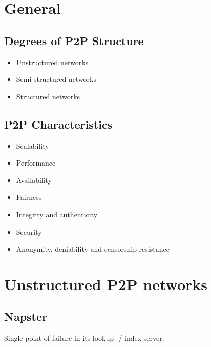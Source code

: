 

	\frontmatter
	\maketitle
	
	\tableofcontents*
	
	\mainmatter
	
	\chapter{General}
	
	\section{Degrees of P2P Structure}
	\begin{itemize}
		\item Unstructured networks
		\item Semi-structured networks
		\item Structured networks	
	\end{itemize}
	
	
	\section{P2P Characteristics}
	\begin{itemize}
		\item Scalability
		\item Performance
		\item Availability
		\item Fairness
		\item Integrity and authenticity
		\item Security
		\item Anonymity, deniability and censorship resistance
	\end{itemize}
	
	\chapter{Unstructured P2P networks}
	
	\section{Napster}
	Single point of failure in its lookup- / index-server.
	

